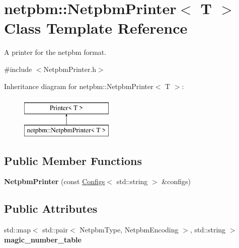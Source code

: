 \hypertarget{classnetpbm_1_1_netpbm_printer}{}\section{netpbm\+::Netpbm\+Printer$<$ T $>$ Class Template Reference}
\label{classnetpbm_1_1_netpbm_printer}


A printer for the netpbm format.  




{\ttfamily \#include $<$Netpbm\+Printer.\+h$>$}

Inheritance diagram for netpbm\+::Netpbm\+Printer$<$ T $>$\+:\begin{figure}[H]
\begin{center}
\leavevmode
\includegraphics[height=2.000000cm]{classnetpbm_1_1_netpbm_printer}
\end{center}
\end{figure}
\subsection*{Public Member Functions}
\begin{DoxyCompactItemize}
\item 
\mbox{\label{classnetpbm_1_1_netpbm_printer_a3e485f8e0b7168890acc6d7ee6099c42}} 
{\bfseries Netpbm\+Printer} (const \mbox{\hyperlink{class_configs}{Configs}}$<$ std\+::string $>$ \&configs)
\end{DoxyCompactItemize}
\subsection*{Public Attributes}
\begin{DoxyCompactItemize}
\item 
std\+::map$<$ std\+::pair$<$ Netpbm\+Type, Netpbm\+Encoding $>$, std\+::string $>$ {\bfseries magic\+\_\+number\+\_\+table}
\end{DoxyCompactItemize}
